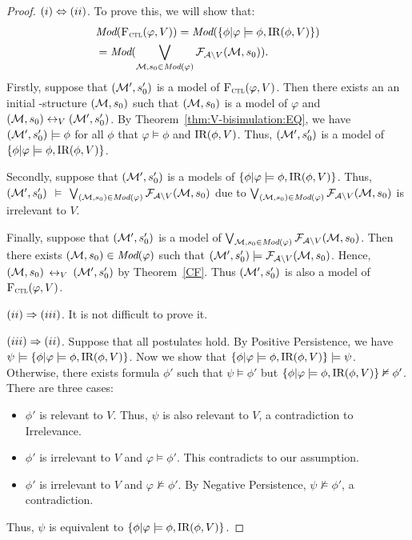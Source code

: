 \documentclass{article}
\begin{document}
\begin{proof}
$(i) \Leftrightarrow (ii)$. To prove this, we will show that:
\begin{align*}
 & \textit{Mod}({\textsc{F}_{\textsc{ctl}}}(\varphi, V)) = \textit{Mod}(\{\phi | \varphi \models \phi, \textrm{IR}(\phi, V)\})\\
 & = \textit{Mod}(\bigvee_{{\cal M}, s_0\in \textit{Mod}(\varphi)} {\cal F}_{{\cal A}\setminus V}({\cal M}, s_0)).
\end{align*}
Firstly, suppose that $({\cal M}', s_0')$ is a model of ${\textsc{F}_{\textsc{ctl}}}(\varphi, V)$. Then there exists an  an initial \MPK-structure $({\cal M}, s_0)$ such that $({\cal M}, s_0)$ is a model of $\varphi$ and $({\cal M}, s_0) \leftrightarrow_V ({\cal M}', s_0')$. By Theorem~\ref{thm:V-bisimulation:EQ}, we have $({\cal M}', s_0') \models \phi$ for all $\phi$ that $\varphi\models \phi$ and $\textrm{IR}(\phi, V)$. Thus, $({\cal M}', s_0')$ is a model of $\{\phi | \varphi \models \phi, \textrm{IR}(\phi, V)\}$.

Secondly, suppose that $({\cal M}', s_0')$ is a models of $\{\phi | \varphi \models \phi, \textrm{IR}(\phi, V)\}$. Thus, $({\cal M}', s_0')$ $\models$ $\bigvee_{({\cal M}, s_0)\in \textit{Mod}(\varphi)} {\cal F}_{{\cal A}\setminus V}({\cal M}, s_0)$ due to $\bigvee_{({\cal M}, s_0)\in \textit{Mod}(\varphi)} {\cal F}_{{\cal A}\setminus V}({\cal M}, s_0)$ is irrelevant to $V$.

Finally, suppose that $({\cal M}', s_0')$ is a model of $\bigvee_{{\cal M}, s_0\in \textit{Mod}(\varphi)} {\cal F}_{{\cal A}\setminus V}({\cal M}, s_0)$. Then there exists $({\cal M}, s_0) \in \textit{Mod}(\varphi)$ such that $({\cal M}', s_0') \models {\cal F}_{{\cal A}\setminus V}({\cal M}, s_0)$. Hence, $({\cal M}, s_0)$ $\leftrightarrow_V$ $({\cal M}', s_0')$ by Theorem~\ref{CF}. Thus $({\cal M}', s_0')$ is also a model of ${\textsc{F}_{\textsc{ctl}}}(\varphi,V)$.


$(ii)\Rightarrow (iii)$. It is not difficult to prove it.

$(iii)\Rightarrow (ii)$. Suppose that all postulates hold. By Positive Persistence, we have $\psi \models \{\phi | \varphi \models \phi, \textrm{IR}(\phi, V)\}$. Now
we show that $\{\phi | \varphi \models \phi, \textrm{IR}(\phi, V)\} \models \psi$. Otherwise, there exists formula $\phi'$ such that $\psi \models \phi'$ but $\{\phi | \varphi \models \phi, \textrm{IR}(\phi, V)\} \nvDash \phi'$. There are three cases:
\begin{itemize}
  \item $\phi'$ is relevant to $V$. Thus, $\psi$ is also relevant to $V$, a contradiction to Irrelevance.
  \item $\phi'$ is irrelevant to $V$ and $\varphi \models \phi'$. This contradicts to our assumption.
  \item $\phi'$ is irrelevant to $V$ and $\varphi \nvDash \phi'$. By Negative Persistence, $\psi \nvDash \phi'$, a contradiction.
\end{itemize}
Thus, $\psi$ is equivalent to $\{\phi | \varphi \models \phi, \textrm{IR}(\phi, V)\}$.
\end{proof}
\end{document}
